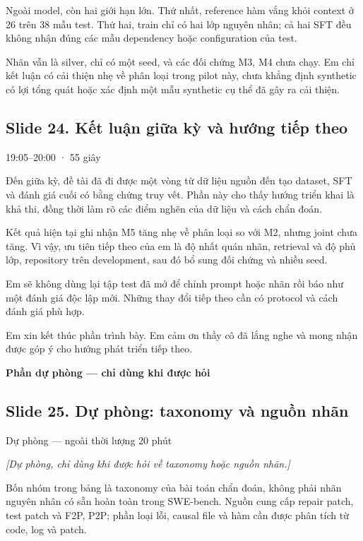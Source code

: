 \documentclass[12pt,a4paper]{article}
\begin{document}
Ngoài model, còn hai giới hạn lớn. Thứ nhất, reference hàm vắng khỏi context ở 26 trên 38 mẫu test. Thứ hai, train chỉ có hai lớp nguyên nhân; cả hai SFT đều không nhận đúng các mẫu dependency hoặc configuration của test.

Nhãn vẫn là silver, chỉ có một seed, và các đối chứng M3, M4 chưa chạy. Em chỉ kết luận có cải thiện nhẹ về phân loại trong pilot này, chưa khẳng định synthetic có lợi tổng quát hoặc xác định một mẫu synthetic cụ thể đã gây ra cải thiện.

\subsection*{Slide 24. Kết luận giữa kỳ và hướng tiếp theo}
{\small\color{gray}19:05–20:00 · 55 giây}\par
Đến giữa kỳ, đề tài đã đi được một vòng từ dữ liệu nguồn đến tạo dataset, SFT và đánh giá cuối có bằng chứng truy vết. Phần này cho thấy hướng triển khai là khả thi, đồng thời làm rõ các điểm nghẽn của dữ liệu và cách chẩn đoán.

Kết quả hiện tại ghi nhận M5 tăng nhẹ về phân loại so với M2, nhưng joint chưa tăng. Vì vậy, ưu tiên tiếp theo của em là độ nhất quán nhãn, retrieval và độ phủ lớp, repository trên development, sau đó bổ sung đối chứng và nhiều seed.

Em sẽ không dùng lại tập test đã mở để chỉnh prompt hoặc nhãn rồi báo như một đánh giá độc lập mới. Những thay đổi tiếp theo cần có protocol và cách đánh giá phù hợp.

Em xin kết thúc phần trình bày. Em cảm ơn thầy cô đã lắng nghe và mong nhận được góp ý cho hướng phát triển tiếp theo.

\clearpage
{\Large\bfseries Phần dự phòng — chỉ dùng khi được hỏi}\par
\subsection*{Slide 25. Dự phòng: taxonomy và nguồn nhãn}
{\small\color{gray}Dự phòng — ngoài thời lượng 20 phút}\par
{\itshape\color{gray}[Dự phòng, chỉ dùng khi được hỏi về taxonomy hoặc nguồn nhãn.]}\par
Bốn nhóm trong bảng là taxonomy của bài toán chẩn đoán, không phải nhãn nguyên nhân có sẵn hoàn toàn trong SWE-bench. Nguồn cung cấp repair patch, test patch và F2P, P2P; phần loại lỗi, causal file và hàm cần được phân tích từ code, log và patch.
\end{document}
